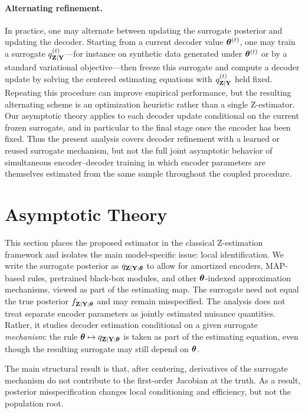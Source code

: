 \documentclass[twoside,11pt]{article}
\begin{document}
\paragraph{Alternating refinement.}
In practice, one may alternate between updating the surrogate posterior and updating the decoder. Starting from a current decoder value ${\bm{\theta}}^{(t)}$, one may train a surrogate $q^{(t)}_{{\bf Z}\mid{\bf Y}}$---for instance on synthetic data generated under ${\bm{\theta}}^{(t)}$ or by a standard variational objective---then freeze this surrogate and compute a decoder update by solving the centered estimating equations with $q^{(t)}_{{\bf Z}\mid{\bf Y}}$ held fixed. Repeating this procedure can improve empirical performance, but the resulting alternating scheme is an optimization heuristic rather than a single Z-estimator. Our asymptotic theory applies to each decoder update conditional on the current frozen surrogate, and in particular to the final stage once the encoder has been fixed. Thus the present analysis covers decoder refinement with a learned or reused surrogate mechanism, but not the full joint asymptotic behavior of simultaneous encoder--decoder training in which encoder parameters are themselves estimated from the same sample throughout the coupled procedure.





\section{Asymptotic Theory}
\label{sec:asymptotics}

This section places the proposed estimator in the classical Z-estimation framework
and isolates the main model-specific issue: local identification. We write the
surrogate posterior as $q_{{\bf Z}\mid{\bf Y};{\bm{\theta}}}$ to allow for amortized encoders,
MAP-based rules, pretrained black-box modules, and other ${\bm{\theta}}$-indexed
approximation mechanisms, viewed as part of the estimating map. The surrogate need
not equal the true posterior $f_{{\bf Z}\mid{\bf Y};{\bm{\theta}}}$ and may remain misspecified. The
analysis does not treat separate encoder parameters as jointly estimated nuisance
quantities. Rather, it studies decoder estimation conditional on a given surrogate
\emph{mechanism}: the rule ${\bm{\theta}} \mapsto q_{{\bf Z}\mid{\bf Y};{\bm{\theta}}}$ is taken as part of the
estimating equation, even though the resulting surrogate may still depend on ${\bm{\theta}}$.

The main structural result is that, after centering, derivatives of the surrogate
mechanism do not contribute to the first-order Jacobian at the truth. As a result,
posterior misspecification changes local conditioning and efficiency, but not the
population root.
\end{document}
